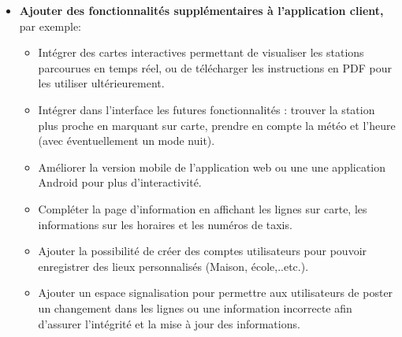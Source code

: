 \begin{itemize}
	\item \textbf{Ajouter des fonctionnalités supplémentaires à l'application client,} par exemple:
		\begin{itemize}
			\item Intégrer des cartes interactives permettant de visualiser les stations parcourues en temps réel, ou de télécharger les instructions en PDF pour les utiliser ultérieurement.
			\item Intégrer dans l'interface les futures fonctionnalités : trouver la station plus proche en marquant sur carte, prendre en compte la météo et l'heure (avec éventuellement un mode nuit).
			\item Améliorer la version mobile de l'application web ou une une application Android pour plus d'interactivité.
			\item Compléter la page d'information en affichant les lignes sur carte, les informations sur les horaires et les numéros de taxis.
			\item Ajouter la possibilité de créer des comptes utilisateurs pour pouvoir enregistrer des lieux personnalisés (Maison, école,..etc.).
			\item Ajouter un espace signalisation pour permettre aux utilisateurs de poster un changement dans les lignes ou une information incorrecte afin d'assurer l'intégrité et la mise à jour des informations.
		\end{itemize}
\end{itemize}
